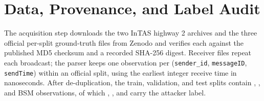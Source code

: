 \documentclass[preprint,12pt,numafflabel]{elsarticle}
\begin{document}
\section{Data, Provenance, and Label Audit}
The acquisition step downloads the two InTAS highway 2 archives and the three official per-split ground-truth files from Zenodo and verifies each against the published MD5 checksum and a recorded SHA-256 digest. Receiver files repeat each broadcast; the parser keeps one observation per (\texttt{sender\_id}, \texttt{messageID}, \texttt{sendTime}) within an official split, using the earliest integer receive time in nanoseconds. After de-duplication, the train, validation, and test splits contain \ResTrainRecords, \ResValidationRecords, and \ResTestRecords{} BSM observations, of which \ResTrainAttacker, \ResValidationAttacker, and \ResTestAttacker{} carry the attacker label.
\end{document}
